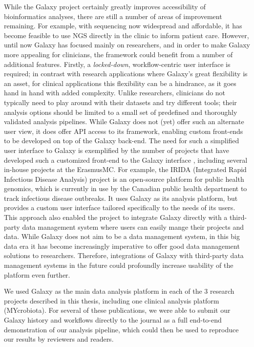 While the Galaxy project certainly greatly improves accessibility of bioinformatics analyses, there are still a number of areas of improvement remaining.
For example, with sequencing now widespread and affordable, it has become feasible to use NGS directly in the clinic to inform patient care.
However, until now Galaxy has focused mainly on researchers, and in order to make Galaxy more appealing for clinicians, the framework could benefit from a number of additional features.
Firstly, a \emph{locked-down}, workflow-centric user interface is required; in contrast with research applications where Galaxy's great flexibility is an asset, for clinical applications this flexibility can be a hindrance, as it goes hand in hand with added complexity.
Unlike researchers, clinicians do not typically need to play around with their datasets and try different tools; their analysis options should be limited to a small set of predefined and thoroughly validated analysis pipelines.
While Galaxy does not (yet) offer such an alternate user view, it does offer API access to its framework, enabling custom front-ends to be developed on top of the Galaxy back-end.
The need for such a simplified user interface to Galaxy is exemplified by the number of projects that have developed such a customized front-end to the Galaxy interface \cite{klingstrom2017galaksio,matthews2018integrated,lemoine2019ngphylogeny,SEEK2015}, including several in-house projects at the ErasmusMC\@.
For example, the IRIDA (Integrated Rapid Infectious Disease Analysis) project \cite{matthews2018integrated} is an open-source platform for public health genomics, which is currently in use by the Canadian public health department to track infectious disease outbreaks.
It uses Galaxy as its analysis platform, but provides a custom user interface tailored specifically to the needs of its users. This approach also enabled the project to integrate Galaxy directly with a third-party data management system where users can easily mange their projects and data.
While Galaxy does not aim to be a data management system, in this big data era it has become increasingly imperative to offer good data management solutions to researchers. Therefore, integrations of Galaxy with third-party data management systems in the future could profoundly increase usability of the platform even further.

We used Galaxy as the main data analysis platform in each of the 3 research projects described in this thesis, including one clinical analysis platform (MYcrobiota). For several of these publications, we were able to submit our Galaxy history and workflows directly to the journal as a full end-to-end demonstration of our analysis pipeline, which could then be used to reproduce our results by reviewers and readers.


